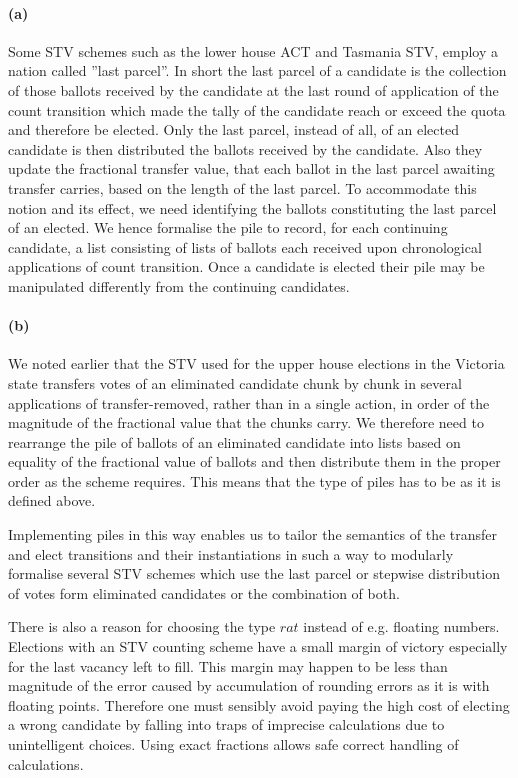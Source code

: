 \documentclass[10pt,conference]{IEEEtran}
\begin{document}
\paragraph*{(a)} Some STV schemes such as the lower house ACT and Tasmania STV, employ a nation called ''last parcel''. In short the last parcel of a candidate is the collection of those ballots received by the candidate at the last round of application of the count transition which made the tally of the candidate reach or exceed the quota and therefore be elected.  Only the last parcel, instead of all, of an elected candidate is then distributed the ballots received by the candidate. Also  they update the fractional transfer value, that each ballot in the last parcel  awaiting transfer carries, based on the length of the last parcel. To  accommodate this notion and its effect, we need identifying the ballots constituting the last parcel of an elected. We hence formalise the pile to record, for each  continuing candidate, a list consisting of lists of ballots each received upon  chronological applications of count transition.  Once a candidate is elected their pile may be manipulated differently from the continuing candidates. 
\paragraph*{(b)} We noted earlier that the STV used for the upper house elections in the Victoria state transfers votes of an eliminated candidate chunk by chunk in several applications of transfer-removed, rather than in a single action, in order of the magnitude of the fractional value that the chunks carry. We therefore need to rearrange the pile of ballots of an eliminated candidate into lists based on equality of the fractional value of ballots and then distribute them in the proper order as the scheme requires. This means that the type of piles has to be as it is defined above.  

Implementing piles in this way enables us to tailor the semantics of the transfer and elect transitions and their instantiations in such a way to modularly formalise several STV schemes which use the last parcel or stepwise distribution of votes form eliminated candidates or the combination of both. 


There is also a reason for choosing the type $rat$  
instead of e.g. floating numbers. Elections with an STV counting scheme have a small margin of victory especially for the last vacancy left to fill. This margin may happen to be less than magnitude of the error caused by accumulation of rounding errors as it is with floating points.  Therefore one must sensibly avoid paying the high  cost of electing a wrong candidate by falling into traps of imprecise calculations due to unintelligent choices. Using exact fractions allows safe  correct handling of calculations. 
\end{document}
